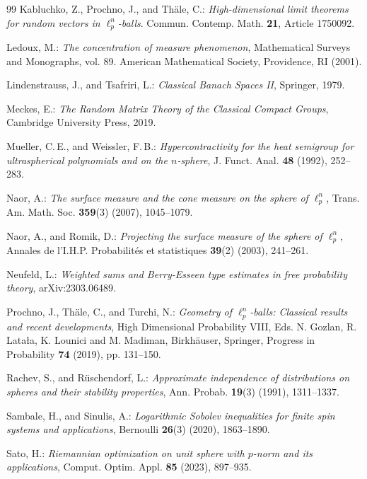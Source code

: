 \documentclass[a4paper,12pt]{amsart}
\numberwithin{equation}{section}
\theoremstyle{remark}
\begin{document}
\begin{thebibliography}{99}
 Kabluchko, Z., Prochno, J., and Th\"{a}le, C.: \emph{High-dimensional limit theorems for random vectors in $\ell_p^n$-balls}. Commun. Contemp. Math. \textbf{21}, Article 1750092.

 Ledoux, M.: \emph{The concentration of measure phenomenon}, Mathematical Surveys and Monographs, vol. 89. American Mathematical Society, Providence, RI (2001).

 Lindenstrauss, J., and Tsafriri, L.: \emph{Classical Banach Spaces II}, Springer, 1979.

 Meckes, E.: \emph{The Random Matrix Theory of the Classical Compact Groups}, Cambridge University Press, 2019.

 Mueller, C.\,E., and Weissler, F.\,B.: \emph{Hypercontractivity for the heat semigroup for ultraspherical polynomials and on the $n$-sphere}, J. Funct. Anal. \textbf{48} (1992), 252--283.

 Naor, A.: \emph{The surface measure and the cone measure on the sphere of $\ell_p^n$}, Trans. Am. Math. Soc. \textbf{359}(3) (2007), 1045--1079.

 Naor, A., and Romik, D.: \emph{Projecting the surface measure of the sphere of $\ell _p^n$}, Annales de l'I.H.P. Probabilit\'{e}s et statistiques \textbf{39}(2) (2003), 241--261.

 Neufeld, L.: \emph{Weighted sums and Berry-Esseen type estimates in free probability theory}, arXiv:2303.06489.

 Prochno, J., Th\"{a}le, C., and Turchi, N.: \emph{Geometry of $\ell_p^n$-balls: Classical results and recent developments}, High Dimensional Probability VIII, Eds. N. Gozlan, R. Lata{\l}a, K. Lounici and M. Madiman, Birkh\"{a}user, Springer, Progress in Probability \textbf{74} (2019), pp. 131--150.

 Rachev, S., and R\"{u}schendorf, L.: \emph{Approximate independence of distributions on spheres and their stability properties}, Ann. Probab. \textbf{19}(3) (1991), 1311--1337.

 Sambale, H., and Sinulis, A.: \emph{Logarithmic Sobolev inequalities for finite spin systems and applications}, Bernoulli \textbf{26}(3) (2020), 1863--1890.

 Sato, H.: \emph{Riemannian optimization on unit sphere with $p$-norm and its applications}, Comput. Optim. Appl. \textbf{85} (2023), 897--935.


\end{thebibliography}
\end{document}

